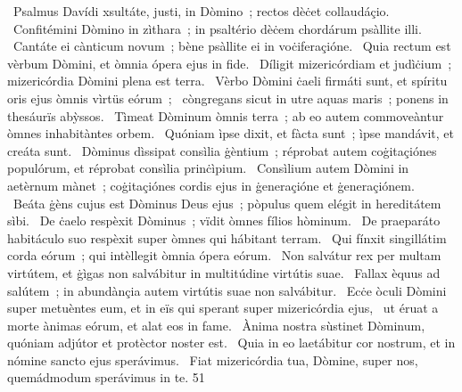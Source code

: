 {~Psalmus Davídi}
{%
xsultáte, justi, in Dòmino~; rectos dèċet collaudáçio.
~Confitémini Dòmino in zìthara~; in psaltério dèċem chordárum psàllite illi.
~Cantáte ei cànticum novum~; bène psàllite ei in voċiferaçióne.
~Quia rectum est vèrbum Dòmini, et òmnia ópera ejus in fide.
~Díligit mizericórdiam et judìċium~; mizericórdia Dòmini plena est terra.
~Vèrbo Dòmini ċaeli firmáti sunt, et spíritu oris ejus òmnis vìrtüs eórum~;
~còngregans sicut in utre aquas maris~; ponens in thesáurïs abỳssos.
~Tìmeat Dòminum òmnis terra~; ab eo autem commoveàntur òmnes inhabitàntes orbem.
~Quóniam ìpse dixit, et fàcta sunt~; ìpse mandávit, et creáta sunt.
~Dòminus dìssipat consìlia ġèntium~; réprobat autem coġitaçiónes populórum, et réprobat consìlia prinċìpium.
~Consìlium autem Dòmini in aetèrnum mànet~; coġitaçiónes cordis ejus in ġeneraçióne et ġeneraçiónem.
~Beáta ġèns cujus est Dòminus Deus ejus~; pòpulus quem elégit in hereditátem sìbi.
~De ċaelo respèxit Dòminus~; vïdit òmnes fílios hòminum.
~De praeparáto habitáculo suo respèxit super òmnes qui hábitant terram.
~Qui fínxit singillátim corda eórum~; qui intèllegit òmnia ópera eórum.
~Non salvátur rex per multam virtútem, et ġìgas non salvábitur in multitúdine virtútis suae.
~Fallax èquus ad salútem~; in abundànçia autem virtútis suae non salvábitur.
~Ecċe òculi Dòmini super metuèntes eum, et in eïs qui sperant super mizericórdia ejus,
~ut éruat a morte ànimas eórum, et alat eos in fame.
~Ànima nostra sùstinet Dòminum, quóniam adjútor et protèctor noster est.
~Quia in eo laetábitur cor nostrum, et in nómine sancto ejus sperávimus.
~Fiat mizericórdia tua, Dòmine, super nos, quemádmodum sperávimus in te.
}
{5}{1}
